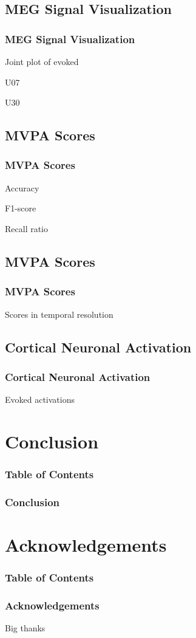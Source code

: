 \documentclass{beamer}
\begin{document}
\subsection{MEG Signal Visualization}
\begin{frame}
    \frametitle{MEG Signal Visualization}
    Joint plot of evoked

    U07

    U30
\end{frame}

\subsection{MVPA Scores}
\begin{frame}
    \frametitle{MVPA Scores}
    Accuracy

    F1-score

    Recall ratio
\end{frame}


\subsection{MVPA Scores}
\begin{frame}
    \frametitle{MVPA Scores}
    Scores in temporal resolution
\end{frame}

\subsection{Cortical Neuronal Activation}
\begin{frame}
    \frametitle{Cortical Neuronal Activation}
    Evoked activations
\end{frame}

\section{Conclusion}
\begin{frame}[plain]
    \frametitle{Table of Contents}
\end{frame}

\begin{frame}
    \frametitle{Conclusion}

\end{frame}

\section{Acknowledgements}
\begin{frame}[plain]
    \frametitle{Table of Contents}
\end{frame}

\begin{frame}
    \frametitle{Acknowledgements}
    Big thanks
\end{frame}
\end{document}
